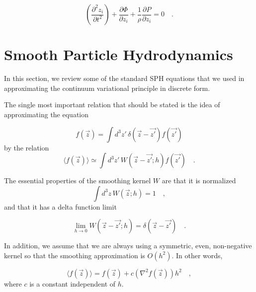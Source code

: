 \documentclass{article}
\def\.{{\quad .}}
\def\_,{{\quad ,}}
\begin{document}
\begin{equation}\label{eq:Euler}
    \left(\frac{\partial^2 z_i}{\partial t^2}\right) + \frac{\partial
    \Phi}{\partial z_i} + \frac{1}{\rho} \frac{\partial P}{\partial z_i} =
    0 \.
\end{equation}



\section{Smooth Particle Hydrodynamics}\label{sph}

In this section, we review some of the standard SPH equations
\cite{A:NP94,A:JJM92,A:WB89,A:GM82,A:PJM91} that we used in approximating the
continuum variational principle in discrete form.

The single most important relation that should be stated is the idea of
approximating the equation

\begin{equation}
    f({\vec z}) = \int\!\! d^3z'\,\delta({\vec z} - \vec{ z'}) f(\vec{z'})
\end{equation}
%
by the relation
\begin{equation}\label{sph_fun}
    \langle f({\vec z}) \rangle \simeq \int\!\! d^3z'\,W({\vec z}
    - \vec{z'}; h) f(\vec{z'}) \.
\end{equation}

The essential properties of the smoothing kernel $W$ are that it is normalized
\begin{equation}\label{norm}
    \int\!\! d^3z\,W({\vec z};h) = 1 \_,
\end{equation}
%
and that it has a delta function limit

\begin{equation}
    \lim_{h \rightarrow 0} W({\vec z} - \vec{z'};h) = \delta({\vec z}
    - \vec{z'}) \.
\end{equation}

In addition, we assume that we are always using a symmetric, even,
non-negative kernel so that the smoothing approximation is $O(h^2)$.
In other words,

\begin{equation}
    \langle f({\vec z}) \rangle = f({\vec z}) + c \left( \nabla^2 f({\vec z}) \right) h^2 \_,
\end{equation}
%
where $c$ is a constant independent of $h$.
\end{document}
